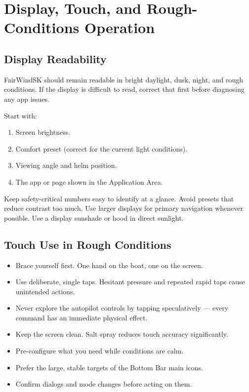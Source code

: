 \chapter{Display, Touch, and Rough-Conditions Operation}
\label{ch:roughconditions}

\section{Display Readability}

FairWindSK should remain readable in bright daylight, dusk, night, and rough
conditions.
If the display is difficult to read, correct that first before diagnosing any
app issues.

Start with:
\begin{enumerate}
  \item Screen brightness.
  \item Comfort preset (correct for the current light conditions).
  \item Viewing angle and helm position.
  \item The app or page shown in the Application Area.
\end{enumerate}

Keep safety-critical numbers easy to identify at a glance.
Avoid presets that reduce contrast too much.
Use larger displays for primary navigation whenever possible.
Use a display sunshade or hood in direct sunlight.

\section{Touch Use in Rough Conditions}

\begin{itemize}
  \item Brace yourself first. One hand on the boat, one on the screen.
  \item Use deliberate, single taps. Hesitant pressure and repeated rapid taps
        cause unintended actions.
  \item Never explore the autopilot controls by tapping speculatively ---
        every command has an immediate physical effect.
  \item Keep the screen clean. Salt spray reduces touch accuracy significantly.
  \item Pre-configure what you need while conditions are calm.
  \item Prefer the large, stable targets of the Bottom Bar main icons.
  \item Confirm dialogs and mode changes before acting on them.
\end{itemize}

